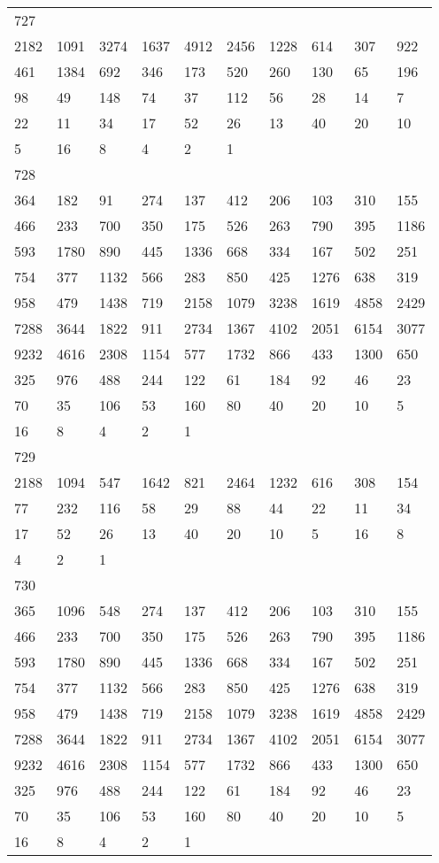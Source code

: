 \begin{longtable}{*{10}{l}}
727&&&&&&&&&\\
2182& 1091& 3274& 1637& 4912& 2456& 1228& 614& 307& 922\\
461& 1384& 692& 346& 173& 520& 260& 130& 65& 196\\
98& 49& 148& 74& 37& 112& 56& 28& 14& 7\\
22& 11& 34& 17& 52& 26& 13& 40& 20& 10\\
5& 16& 8& 4& 2& 1& \\

728&&&&&&&&&\\
364& 182& 91& 274& 137& 412& 206& 103& 310& 155\\
466& 233& 700& 350& 175& 526& 263& 790& 395& 1186\\
593& 1780& 890& 445& 1336& 668& 334& 167& 502& 251\\
754& 377& 1132& 566& 283& 850& 425& 1276& 638& 319\\
958& 479& 1438& 719& 2158& 1079& 3238& 1619& 4858& 2429\\
7288& 3644& 1822& 911& 2734& 1367& 4102& 2051& 6154& 3077\\
9232& 4616& 2308& 1154& 577& 1732& 866& 433& 1300& 650\\
325& 976& 488& 244& 122& 61& 184& 92& 46& 23\\
70& 35& 106& 53& 160& 80& 40& 20& 10& 5\\
16& 8& 4& 2& 1& \\

729&&&&&&&&&\\
2188& 1094& 547& 1642& 821& 2464& 1232& 616& 308& 154\\
77& 232& 116& 58& 29& 88& 44& 22& 11& 34\\
17& 52& 26& 13& 40& 20& 10& 5& 16& 8\\
4& 2& 1& \\

730&&&&&&&&&\\
365& 1096& 548& 274& 137& 412& 206& 103& 310& 155\\
466& 233& 700& 350& 175& 526& 263& 790& 395& 1186\\
593& 1780& 890& 445& 1336& 668& 334& 167& 502& 251\\
754& 377& 1132& 566& 283& 850& 425& 1276& 638& 319\\
958& 479& 1438& 719& 2158& 1079& 3238& 1619& 4858& 2429\\
7288& 3644& 1822& 911& 2734& 1367& 4102& 2051& 6154& 3077\\
9232& 4616& 2308& 1154& 577& 1732& 866& 433& 1300& 650\\
325& 976& 488& 244& 122& 61& 184& 92& 46& 23\\
70& 35& 106& 53& 160& 80& 40& 20& 10& 5\\
16& 8& 4& 2& 1& \\


\end{longtable}
